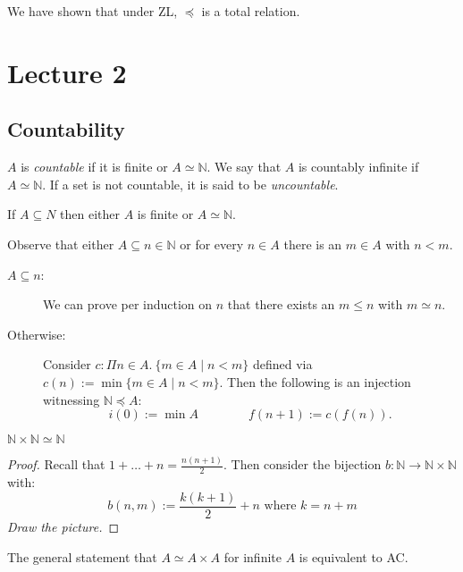 \documentclass{whrartcl}
\newcommand{\NN}{\mathbb{N}}
\begin{document}
\begin{remark}
  We have shown that under ZL, $\preceq$ is a total relation.
\end{remark}


\newpage

\section{Lecture 2}

\subsection*{Countability}

\begin{definition}
  $A$ is \emph{countable} if it is finite or $A \simeq \NN$. We say that $A$ is
  countably infinite if $A \simeq \NN$. If a set is not countable, it is said to
  be \emph{uncountable}.
\end{definition}

\begin{theorem}
  If $A \subseteq N$ then either $A$ is finite or $A \simeq \NN$.
\end{theorem}
\begin{proofsketch}
  Observe that either $A \subseteq n \in \NN$ or for every $n \in A$ there is an
  $m \in A$ with $n < m$.
  \begin{description}
  \item[$A \subseteq n$:] We can prove per induction on $n$ that there exists an
    $m \leq n$ with $m \simeq n$.
  \item[Otherwise:] Consider $c : \Pi n \in A.~\{m \in A \mid n <
    m\}$ defined via
    \(
      c(n) := \min \{m \in A \mid n < m\}
      \). Then the following is an injection witnessing $\NN \preceq A$:
      \[
        i(0) := \min A \qquad \qquad f(n + 1) := c(f(n)).
      \]
  \end{description}
\end{proofsketch}

\begin{lemma}
  $\NN \times \NN \simeq \NN$
\end{lemma}
\begin{proof}
  Recall that $1 + \ldots + n = \frac{n(n + 1)}{2}$. Then consider the bijection
  $b : \NN \to \NN \times \NN$ with:
  \[b(n, m) := \frac{k(k + 1)}{2} + n \text{ where } k = n + m\]
  \emph{Draw the picture.}
\end{proof}
\begin{remark}
  The general statement that $A \simeq A \times A$ for infinite $A$ is
  equivalent to AC.
\end{remark}
\end{document}
